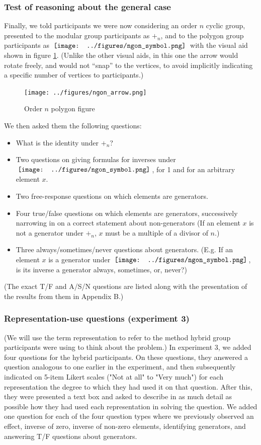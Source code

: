 \documentclass[man,10pt]{apa6}
\newcommand{\ngon}{\,\vcenter{\hbox{\texttt{[image: ../figures/ngon\_symbol.png]}}}\,}
\begin{document}
\subsubsection{Test of reasoning about the general case}
Finally, we told participants we were now considering an order $n$ cyclic group, presented to the modular group participants as $+_n$, and to the polygon group participants as $\ngon$ with the visual aid shown in figure \ref{ngonex}. (Unlike the other visual aids, in this one the arrow would rotate freely, and would not ``snap'' to the vertices, to avoid implicitly indicating a specific number of vertices to participants.) 
\begin{figure} \centering \texttt{[image: ../figures/ngon\_arrow.png]} \caption{Order $n$ polygon figure} \label{ngonex} \end{figure} \noindent
We then asked them the following questions: 
\begin{itemize}
\item What is the identity under $+_n$?
\item Two questions on giving formulas for inverses under $\ngon$, for 1 and for an arbitrary element $x$.
\item Two free-response questions on which elements are generators. 
\item Four true/false questions on which elements are generators, successively narrowing in on a correct statement about non-generators (If an element $x$ is not a generator under $+_n$, $x$ must be a multiple of a divisor of $n$.)
\item Three always/sometimes/never questions about generators. (E.g. If an element $x$ is a generator under $\ngon$, is its inverse a generator always, sometimes, or, never?) 
\end{itemize}
(The exact T/F and A/S/N questions are listed along with the presentation of the results from them in Appendix B.)
\subsubsection{Representation-use questions (experiment 3)}
(We will use the term representation to refer to the method hybrid group participants were using to think about the problem.) In experiment 3, we added four questions for the hybrid participants. On these questions, they answered a question analogous to one earlier in the experiment, and then subsequently indicated on 5-item Likert scales ("Not at all" to "Very much") for each representation the degree to which they had used it on that question. After this, they were presented a text box and asked to describe in as much detail as possible how they had used each representation in solving the question. We added one question for each of the four question types where we previously observed an effect, inverse of zero, inverse of non-zero elements, identifying generators, and answering T/F questions about generators.
\end{document}
